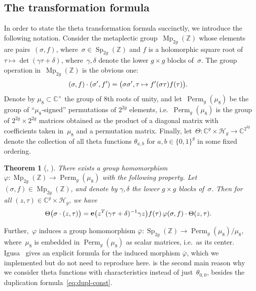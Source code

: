 \documentclass[12pt,oneside]{amsart}
\numberwithin{equation}{section}
\newtheorem{thm}[equation]{Theorem}
\theoremstyle{definition}
\newcommand{\Z}{\mathbb{Z}}
\newcommand{\C}{\mathbb{C}}
\newcommand{\Half}{\mathcal{H}}
\renewcommand{\phi}{\varphi}
\DeclareMathOperator{\Sp}{Sp}
\DeclareMathOperator{\Mp}{Mp}
\DeclareMathOperator{\e}{\mathbf{e}}
\DeclareMathOperator{\Perm}{Perm}
\DeclarePairedDelimiter{\paren}{(}{)}
\begin{document}
\subsection{The transformation formula}
\label{subsec:transf}

In order to state the theta transformation formula succinctly, we introduce the
following notation.  Consider the metaplectic group~$\Mp_{2g}(\Z)$ whose
elements are pairs~$(\sigma,f)$, where~$\sigma\in \Sp_{2g}(\Z)$ and $f$ is a
holomorphic square root of $\tau\mapsto\det(\gamma\tau+\delta)$,
where~$\gamma,\delta$ denote the lower $g\times g$ blocks of~$\sigma$. The
group operation in~$\Mp_{2g}(\Z)$ is the obvious one:
\begin{equation}
  \label{eq:metaplectic}
  (\sigma,f)\cdot(\sigma',f') = \paren[\big]{\sigma\sigma', \tau\mapsto f'(\sigma\tau) f(\tau)}.
\end{equation}
Denote by $\mu_8\subset\C^\times$ the group of 8th roots of unity, and
let~$\Perm_g(\mu_8)$ be the group of ``$\mu_8$-signed'' permutations of
$2^{2g}$ elements, i.e.~$\Perm_g(\mu_8)$ is the group of $2^{2g}\times 2^{2g}$
matrices obtained as the product of a diagonal matrix with coefficients taken
in~$\mu_8$ and a permutation matrix. Finally,
let~$\Theta:\C^g\times\Half_g\to \C^{2^{2g}}$ denote the collection of all
theta functions $\theta_{a,b}$ for $a,b\in \{0,1\}^g$ in some fixed ordering.

\begin{thm}[{\cite[(5.1) p.\,189]{mumfordTataLecturesTheta1983},
    \cite[Thm.~2 p.\,175]{igusaThetaFunctions1972}}]
  \label{thm:theta-transf}
  There exists a group homomorphism $\phi: \Mp_{2g}(\Z)\to \Perm_g(\mu_8)$ with
  the following property. Let $(\sigma,f)\in \Mp_{2g}(\Z)$, and denote by
  $\gamma,\delta$ the lower $g\times g$ blocks of~$\sigma$. Then for all
  $(z,\tau)\in \C^g\times\Half_g$, we have
  \begin{displaymath}
    \Theta\paren[\big]{\sigma\cdot(z,\tau)} = \e\paren[\big]{z^T(\gamma\tau + \delta)^{-1} \gamma z}
    f(\tau)\, \phi(\sigma,f) \cdot \Theta(z,\tau).
  \end{displaymath}
\end{thm}

Further,~$\phi$ induces a group homomorphism
$\overline{\phi}:\Sp_{2g}(\Z) \to \Perm_g(\mu_8)/\mu_8$, where~$\mu_8$ is
embedded in $\Perm_g(\mu_8)$ as scalar matrices, i.e.~as its
center. Igusa~\cite[Thm.~2 p.\,175]{igusaThetaFunctions1972} gives an explicit
formula for the induced morphism $\overline{\phi}$, which we implemented but do
not need to reproduce here.   is the second main reason
why we consider theta functions with characteristics instead of
just~$\theta_{0,0}$, besides the duplication formula~\eqref{eq:dupl-const}.
\end{document}
